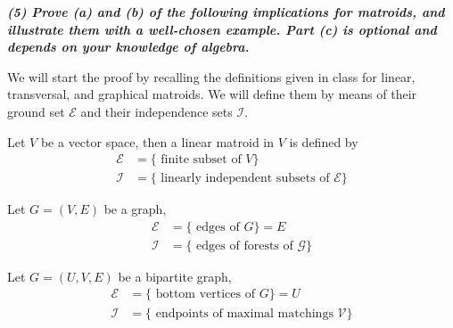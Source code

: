 \textbf{\textit{(5) Prove (a) and (b) of the following implications for matroids, and illustrate them with a well-chosen example. Part (c) is optional and depends on your knowledge of algebra.}}

\begin{center}
\end{center}

\vspace{3pt}

We will start the proof by recalling the definitions given in class for linear, transversal, and graphical matroids.
We will define them by means of their ground set $\mathcal{E}$ and their independence sets $\mathcal{I}$.

\begin{definition}
    Let $V$ be a vector space, then a linear matroid in $V$ is defined by
    \begin{equation*}
        \begin{split}
            \mathcal{E} & = \lbrace \text{ finite subset of } V \rbrace \\
            \mathcal{I} & = \lbrace \text{ linearly independent subsets of } \mathcal{E} \rbrace
        \end{split}
    \end{equation*}
\end{definition}

\begin{definition}
    Let $G = (V, E)$ be a graph,
    \begin{equation*}
        \begin{split}
            \mathcal{E} & = \lbrace \text{ edges of } G \rbrace = E \\
            \mathcal{I} & = \lbrace \text{ edges of forests of } \mathcal{G} \rbrace
        \end{split}
    \end{equation*}
\end{definition}

\begin{definition}
    Let $G = (U, V, E)$ be a bipartite graph,
    \begin{equation*}
        \begin{split}
            \mathcal{E} & = \lbrace \text{ bottom vertices of } G \rbrace = U \\
            \mathcal{I} & = \lbrace \text{ endpoints of maximal matchings } \mathcal{V} \rbrace
        \end{split}
    \end{equation*}
\end{definition}

